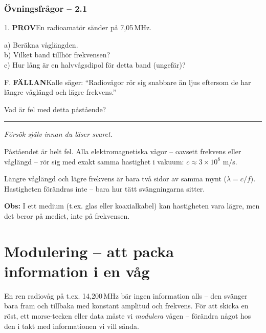 \documentclass[a4paper,11pt,twoside]{book}
\newcommand{\qprov}{\colorbox{redpale}{\textcolor{reddark}{\headingfont\bfseries\tiny PROV}}}
\newcommand{\qfallan}{\colorbox{ljusbrun}{\textcolor{kakao}{\headingfont\bfseries\tiny FÄLLAN}}}
\begin{document}
\subsubsection*{Övningsfrågor -- 2.1}

\begin{qblock}{1.}
\qprov\quad En radioamatör sänder på 7,05\,MHz.

a) Beräkna våglängden.\\
b) Vilket band tillhör frekvensen?\\
c) Hur lång är en halvvågsdipol för detta band (ungefär)?
\end{qblock}

\begin{qblock}{F.}
\qfallan\quad Kalle säger: ``Radiovågor rör sig snabbare än ljus
eftersom de har längre våglängd och lägre frekvens.''

Vad är fel med detta påstående?
\end{qblock}

\medskip
\noindent\rule{\textwidth}{0.4pt}
{\small\itshape Försök själv innan du läser svaret.}
\medskip

\begin{worked}[title={Lösning -- Fallgropsfråga 2.1\,F}]
Påståendet är helt fel. Alla elektromagnetiska vågor -- oavsett
frekvens eller våglängd -- rör sig med exakt samma hastighet i
vakuum: $c \approx 3 \times 10^8$ m/s.

Längre våglängd och lägre frekvens är bara två sidor av samma mynt
($\lambda = c/f$). Hastigheten förändras inte -- bara hur tätt
svängningarna sitter.

\textbf{Obs:} I ett medium (t.ex. glas eller koaxialkabel) kan
hastigheten vara lägre, men det beror på mediet, inte på frekvensen.
\end{worked}

\section{Modulering -- att packa information i en våg}

En ren radiovåg på t.ex. 14,200\,MHz bär ingen information alls --
den svänger bara fram och tillbaka med konstant amplitud och frekvens.
För att skicka en röst, ett morse-tecken eller data måste vi
\emph{modulera} vågen -- förändra något hos den i takt med
informationen vi vill sända.
\end{document}
